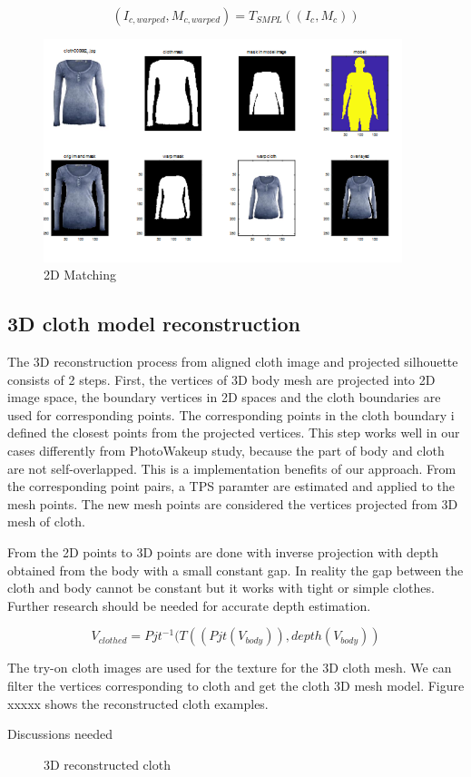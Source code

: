 \begin{equation}
(I_{c, warped}, M_{c, warped})  = T_{SMPL} ((I_c, M_c))
\end{equation}


\begin{figure}
\centering
\includegraphics[height=6.5cm, scale=0.7]{figures/2dmatching.png}   %
\caption{2D Matching}
\label{fig:2DmatchingOfClothAndBody}
\end{figure}


\subsection{3D cloth model reconstruction }


The 3D reconstruction process from aligned cloth image and projected silhouette consists of 2 steps. First, the vertices of 3D body mesh are projected into 2D image space, the boundary  vertices in 2D spaces and the cloth boundaries are used for corresponding points. The corresponding points in the cloth boundary i defined the closest points from the projected vertices.  This step works well in our cases differently from PhotoWakeup study, because the part of body and cloth are not self-overlapped. This is a implementation benefits of our approach. From the corresponding point pairs, a TPS paramter are estimated and applied to the mesh points. The new mesh points are considered the vertices projected from 3D mesh of cloth.    

From the 2D points to 3D points are done with inverse projection with depth obtained from the body with a small constant gap. In reality the gap between the cloth and body cannot be constant but it works with tight or simple clothes. Further research should be needed for accurate depth estimation.   

\begin{equation}
V_{clothed} = Pjt^{-1} ( T( (Pjt(V_{body})), depth(V_{body}) )
\end{equation}


The try-on cloth images are used for the texture for the 3D cloth mesh. We can filter the vertices corresponding to cloth and get the cloth 3D mesh model. Figure xxxxx shows the reconstructed cloth examples. 


Discussions needed


\begin{figure}
\centering
\caption{3D reconstructed cloth}
\label{fig:3DreconstructedCloth}
\end{figure}



